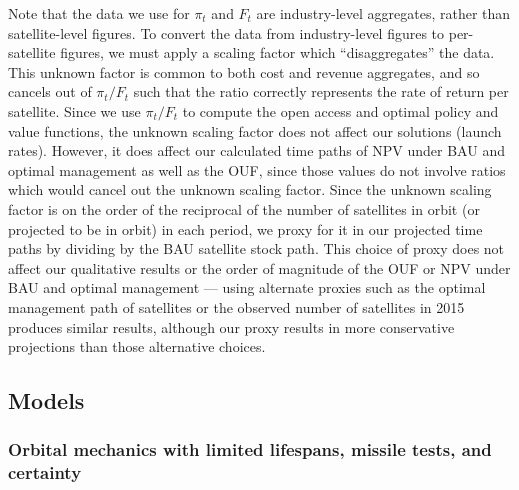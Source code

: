 \documentclass[9pt,twoside,lineno]{pnas-new}
\begin{document}
Note that the data we use for $\pi_t$ and $F_t$ are industry-level aggregates, rather than satellite-level figures. To convert the data from industry-level figures to per-satellite figures, we must apply a scaling factor which ``disaggregates'' the data. This unknown factor is common to both cost and revenue aggregates, and so cancels out of $\pi_t/F_t$ such that the ratio correctly represents the rate of return per satellite. Since we use $\pi_t/F_t$ to compute the open access and optimal policy and value functions, the unknown scaling factor does not affect our solutions (launch rates). However, it does affect our calculated time paths of NPV under BAU and optimal management as well as the OUF, since those values do not involve ratios which would cancel out the unknown scaling factor. Since the unknown scaling factor is on the order of the reciprocal of the number of satellites in orbit (or projected to be in orbit) in each period, we proxy for it in our projected time paths by dividing by the BAU satellite stock path. This choice of proxy does not affect our qualitative results or the order of magnitude of the OUF or NPV under BAU and optimal management --- using alternate proxies such as the optimal management path of satellites or the observed number of satellites in 2015 produces similar results, although our proxy results in more conservative projections than those alternative choices. %

\subsection{Models}

\subsubsection{Orbital mechanics with limited lifespans, missile tests, and certainty}
\end{document}
